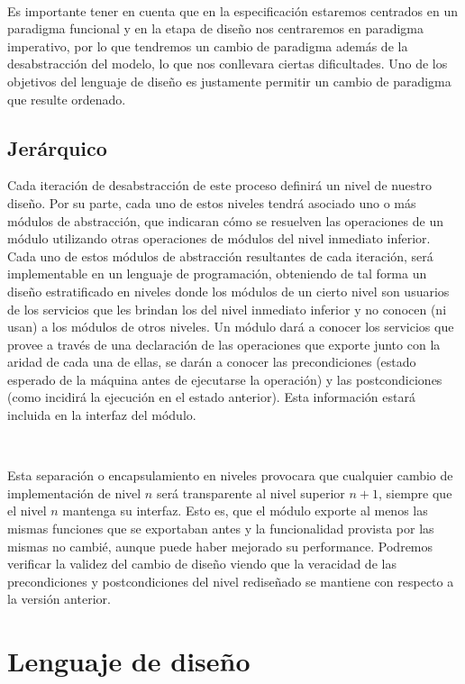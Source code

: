 \documentclass[10pt, a4paper]{report}
\begin{document}
~

Es importante tener en cuenta que en la especificaci\'on estaremos centrados en un paradigma funcional y en la etapa de dise\~no nos centraremos en paradigma imperativo, por lo que tendremos un cambio de paradigma adem\'as de la desabstracci\'on del modelo, lo que nos conllevara ciertas dificultades. Uno de los objetivos del lenguaje de dise\~no es justamente permitir un cambio de paradigma que resulte ordenado.

\subsection{Jer\'arquico}

Cada iteraci\'on de desabstracci\'on de este proceso definir\'a un nivel de nuestro dise\~no. Por su parte, cada uno de estos niveles tendr\'a asociado uno o m\'as m\'odulos de abstracci\'on, que indicaran c\'omo se resuelven las operaciones de un m\'odulo utilizando otras operaciones de m\'odulos del nivel inmediato inferior. Cada uno de estos m\'odulos de abstracci\'on resultantes de cada iteraci\'on, ser\'a implementable en un lenguaje de programaci\'on, obteniendo de tal forma un dise\~no estratificado en niveles donde los m\'odulos de un cierto nivel son usuarios de los servicios que les brindan los del nivel inmediato inferior y no conocen (ni usan) a los m\'odulos de otros niveles. Un m\'odulo dar\'a a conocer los servicios que provee a trav\'es de una declaraci\'on de las operaciones que exporte junto con la aridad de cada una de ellas, se dar\'an a conocer las precondiciones (estado esperado de la m\'aquina antes de ejecutarse la operaci\'on) y las postcondiciones (como incidir\'a la ejecuci\'on en 
el estado anterior). Esta informaci\'on estar\'a incluida en la interfaz del m\'odulo.

~

Esta separaci\'on o encapsulamiento en niveles provocara que cualquier cambio de implementaci\'on de nivel $n$ ser\'a transparente al nivel superior $n+1$, siempre que el nivel $n$ mantenga su interfaz. Esto es, que el m\'odulo exporte al menos las mismas funciones que se exportaban antes y la funcionalidad provista por las mismas no cambi\'e, aunque puede haber mejorado su performance. Podremos verificar la validez del cambio de dise\~no viendo que la veracidad de las precondiciones y postcondiciones del nivel redise\~nado se mantiene con respecto a la versi\'on anterior.

\section{Lenguaje de dise\~no}
\end{document}
